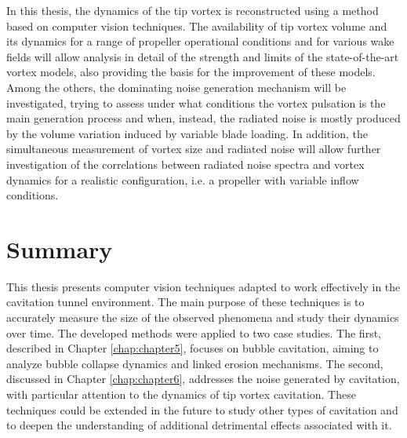 In this thesis, the dynamics of the tip vortex is reconstructed using a method based on computer vision techniques.
The availability of tip vortex volume and its dynamics for a range of propeller operational conditions and for various wake fields will allow analysis in detail of the strength and limits of the state-of-the-art vortex models, also providing the basis for the improvement of these models.
Among the others, the dominating noise generation mechanism will be investigated, trying to assess under what conditions the vortex pulsation is the main generation process and when, instead, the radiated noise is mostly produced by the volume variation induced by variable blade loading. 
In addition, the simultaneous measurement of vortex size and radiated noise will allow further investigation of the correlations between radiated noise spectra and vortex dynamics for a realistic configuration, i.e. a propeller with variable inflow conditions.

\section{Summary}

This thesis presents computer vision techniques adapted to work effectively in the cavitation tunnel environment. The main purpose of these techniques is to accurately measure the size of the observed phenomena and study their dynamics over time.
The developed methods were applied to two case studies. The first, described in Chapter \ref{chap:chapter5}, focuses on bubble cavitation, aiming to analyze bubble collapse dynamics and linked erosion mechanisms. The second, discussed in Chapter \ref{chap:chapter6}, addresses the noise generated by cavitation, with particular attention to the dynamics of tip vortex cavitation.
These techniques could be extended in the future to study other types of cavitation and to deepen the understanding of additional detrimental effects associated with it.